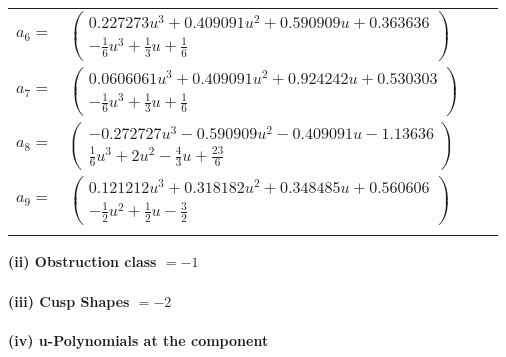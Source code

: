 \documentclass[1p]{elsarticle_modified}
\theoremstyle{definition}
\begin{document}
\begin{tabular}{m{7pt} m{180pt} m{7pt} m{180pt} }
\flushright $a_{6}=$&$\begin{pmatrix}0.227273 u^{3}+0.409091 u^{2}+0.590909 u+0.363636\\-\frac{1}{6} u^3+\frac{1}{3} u+\frac{1}{6}\end{pmatrix}$ \\
\flushright $a_{7}=$&$\begin{pmatrix}0.0606061 u^{3}+0.409091 u^{2}+0.924242 u+0.530303\\-\frac{1}{6} u^3+\frac{1}{3} u+\frac{1}{6}\end{pmatrix}$ \\
\flushright $a_{8}=$&$\begin{pmatrix}-0.272727 u^{3}-0.590909 u^{2}-0.409091 u-1.13636\\\frac{1}{6} u^3+2 u^2-\frac{4}{3} u+\frac{23}{6}\end{pmatrix}$ \\
\flushright $a_{9}=$&$\begin{pmatrix}0.121212 u^{3}+0.318182 u^{2}+0.348485 u+0.560606\\-\frac{1}{2} u^2+\frac{1}{2} u-\frac{3}{2}\end{pmatrix}$\\&\end{tabular}
\flushleft \textbf{(ii) Obstruction class $= -1$}\\~\\
\flushleft \textbf{(iii) Cusp Shapes $= -2$}\\~\\
\newpage\renewcommand{\arraystretch}{1}
\flushleft \textbf{(iv) u-Polynomials at the component}\newline \\
\end{document}
